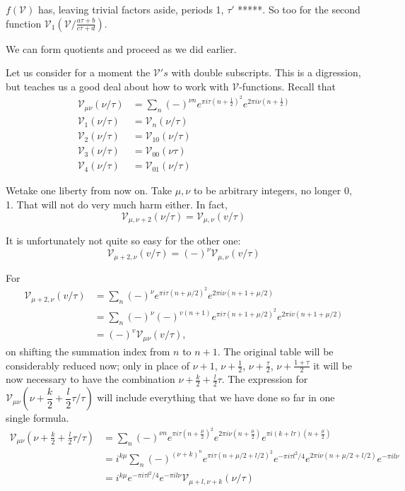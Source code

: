 $f(\mathscr{V})$ has, leaving trivial factors aside, periods 1,
$\tau'$ *****. So too for the second function $\mathscr{V}_1
\left(\mathscr{V}\Big/ \frac{a \tau+ b}{c\tau + d}\right)$.

We can form quotients and proceed as we did earlier. 

Let us consider for a moment the $\mathscr{V}'s$ with double
subscripts. This is a digression, but teaches us a good deal about how
to work with $\mathscr{V}$-functions. Recall that 
\begin{align*}
  \mathscr{V}_{\mu \nu}(\nu/\tau) &= \sum_{n} (-)^{\nu n} e^{\pi i
    \tau \left(n + \frac{1}{2}\right)^2} e^{2 \pi i \nu \left(n+
    \frac{1}{2}\right)}\\
  \mathscr{V}_1 (\nu/ \tau) & = \mathscr{V}_n (\nu/\tau)\\
  \mathscr{V}_2 (\nu/\tau) & = \mathscr{V}_{10} (\nu/\tau)\\
  \mathscr{V}_3(\nu/\tau) & = \mathscr{V}_{00} (\nu\tau)\\
  \mathscr{V}_4 (\nu /\tau) & = \mathscr{V}_{01} (\nu/\tau)
\end{align*}

We\pageoriginale take one liberty from now on. Take $\mu, \nu$ to be
arbitrary integers, no longer 0, 1. That will not do very much harm
either. In fact,
$$
\mathscr{V}_{\mu , \nu+2} (\nu/\tau)= \mathscr{V}_{\mu, \nu} (v/\tau)
$$

It is unfortunately not quite so easy for the other one:
$$
\mathscr{V}_{\mu +2, \nu} (v/\tau)= (-)^\nu \mathscr{V}_{\mu,\nu} (v/\tau)
$$

For 
\begin{align*}
  \mathscr{V}_{\mu +2, \nu} (v/\tau) & = \sum_{n} (-)^{\nu} e^{\pi i
    \tau(n +\mu /2)^2} e^{2 \pi i \nu (n+1+\mu/2)}\\
  & = \sum_{n} (-)^{\nu} (-)^{v(n+1)} e^{\pi i \tau (n+1+ \mu/2)^2} e^{2
    \pi i v (n+1+\mu/2)}\\
  & = (-)^v \mathscr{V}_{\mu \nu} (v/\tau),
\end{align*}
on shifting the summation index from $n$ to $n+ 1$. The original table
will be considerably reduced now; only in place of $\nu+1$, $\nu+
\frac{1}{2}$, $\nu+ \frac{\tau}{2}$, $\nu+ \frac{1+\tau}{2}$ it will
be now necessary to have the combination $\nu +\frac{k}{2} +
\frac{l}{2} \tau$. The expression for $\mathscr{V}_{\mu \nu} \left(\nu
+ \dfrac{k}{2} + \dfrac{l}{2}  \tau/ \tau \right)$ will include
everything that we have done so far in one single formula. 
\begin{align*}
  \mathscr{V}_{\mu \nu} \left( \nu + \frac{k}{2} + \frac{l}{2}
  \tau/\tau\right)  & = \sum_{n} (-)^{\nu n} e^{\pi i \tau (n+
    \frac{\mu}{2})^2} e^{2 \pi i \nu (n+ \frac{\mu}{2})} e^{\pi i (k+l
    \tau)(n+ \frac{\mu}{2})}\\
  & = i^{k \mu} \sum_n (-)^{(\nu+ k)^n} e^{\pi i \tau(n+ \mu/2+
    l/2)^2} e^{- \pi i \tau l^2/4} e^{2 \pi i \nu (n+ \mu/2+l/2)} e^{-
  \pi i l \nu}\\
  & = i^{k \mu} e^{-\pi i \tau l^2/4} e^{- \pi i l \nu}
  \mathscr{V}_{\mu +l, \nu+k} (\nu/\tau) \tag{*}
\end{align*}\pageoriginale 

